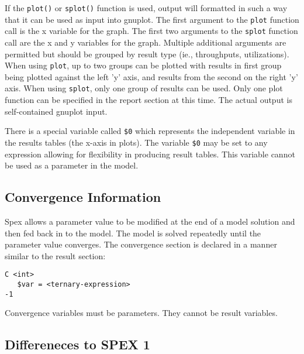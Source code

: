 If the \texttt{plot()} or \texttt{splot()} function is used, output will formatted in such a way that it
can be used as input into gnuplot.  The first argument to the \texttt{plot}
function call is the x variable for the graph.  The first two arguments to the \texttt{splot}
function call are the x and y variables for the graph.  Multiple additional arguments are permitted
but should be grouped by result type (ie., throughputs, utilizations).  When using
\texttt{plot}, up to two groups can be plotted with
results in first group being plotted against the left 'y' axis, and results from the second on
the right 'y' axis.  When using
\texttt{splot}, only one group of results can be used. Only one plot function can be specified
in the report section at this time.  The actual output is self-contained gnuplot input.

There is a special variable called \texttt{\$0} which represents the independent variable in the
results tables (the x-axis in plots).  The variable \texttt{\$0} may be set to any expression allowing for
flexibility in producing result tables.  This variable cannot be used as a parameter in the model.

\subsection{Convergence Information}
\label{sec:lqn-convergence-information}

Spex allows a parameter value to be modified at the end of a model solution and
then fed back in to the model.  The model is solved repeatedly until the parameter
value converges.  The convergence section is declared in a manner similar to the
result section:

\lstset{language=LQN,basicstyle=\ttfamily,numbersep=10pt,firstnumber=1}
\begin{lstlisting}[caption={Convergence Information},label=lst:lqn-convergence-info,frame=single]
C <int>
   $var = <ternary-expression>
-1
\end{lstlisting}

Convergence variables must be parameters.  They cannot be
result variables.

\subsection{Differeneces to SPEX 1}

